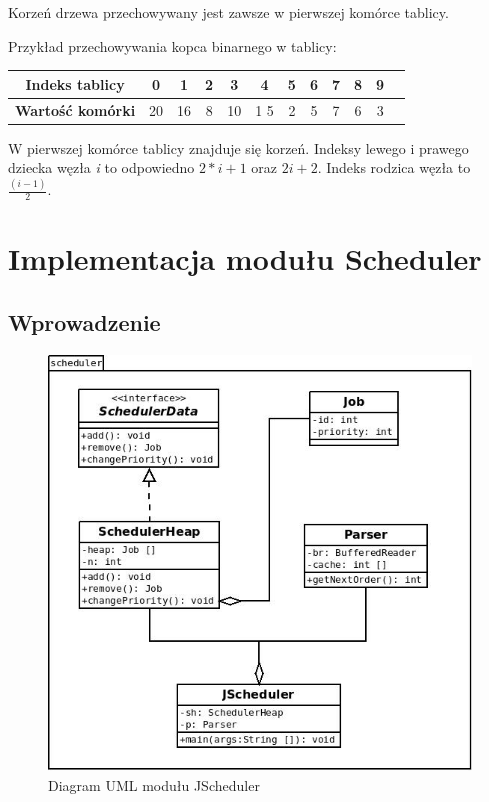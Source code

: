 \documentclass[12pt,a4paper]{article}
\begin{document}
Korzeń drzewa przechowywany jest zawsze w pierwszej komórce tablicy. 

Przykład przechowywania kopca binarnego w tablicy:

\vspace{5pt}
\begin{tabular}{| c | c | c | c | c | c | c | c | c | c | c | c | }
	\hline
	\textbf{Indeks tablicy} & 0 & 1 & 2 & 3 & 4 & 5 & 6 & 7 & 8 & 9	\\
	\hline
	\textbf{Wartość komórki} & 20	& 16 & 8 & 10 & 1 5 & 2 & 5 & 7 & 6 & 3 \\
	\hline
	\end{tabular}
\vspace{5pt}

W pierwszej komórce tablicy znajduje się korzeń. Indeksy lewego i prawego dziecka węzła \textit{i} to odpowiedno
 \textit{$2*i+1$} oraz \textit{$2i+2$}. Indeks rodzica węzła to \textit{$\frac{(i-1)}{2}$}.

\section{Implementacja modułu Scheduler}

\subsection{Wprowadzenie}

\begin{figure}[h]
	\centering
	\includegraphics[scale=0.5]{img/diagram.jpg} 
	\caption{Diagram UML modułu JScheduler}
\end{figure}
\end{document}
